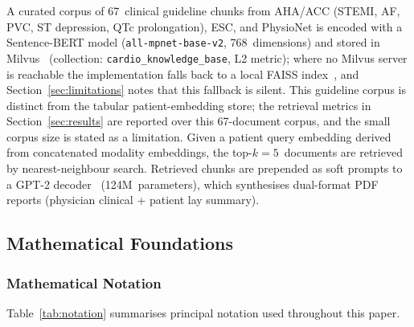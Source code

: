 \documentclass[AMA,STIX1COL,]{WileyNJD-v2}
\begin{document}
A curated corpus of 67~clinical guideline chunks from AHA/ACC
(STEMI, AF, PVC, ST depression, QTc prolongation), ESC, and PhysioNet
is encoded with a Sentence-BERT model (\texttt{all-mpnet-base-v2},
768~dimensions) and stored in Milvus~\cite{wang2021milvus} (collection:
\texttt{cardio\_knowledge\_base}, L2 metric); where no Milvus server is
reachable the implementation falls back to a local FAISS
index~\cite{douze2024}, and Section~\ref{sec:limitations} notes that this
fallback is silent. This guideline corpus is
distinct from the tabular patient-embedding store; the retrieval
metrics in Section~\ref{sec:results} are reported over this 67-document
corpus, and the small corpus size is stated as a limitation. Given a
patient query embedding derived from concatenated modality embeddings,
the top-$k = 5$~documents are retrieved by nearest-neighbour search.
Retrieved chunks are prepended as soft prompts to a GPT-2
decoder~\cite{radford2019} (124M~parameters), which synthesises
dual-format PDF reports
(physician clinical + patient lay summary).

\subsection{Mathematical Foundations}
\label{sec:math}

\subsubsection{Mathematical Notation}
\label{sec:notation}

Table~\ref{tab:notation} summarises principal notation used throughout
this paper.
\end{document}
